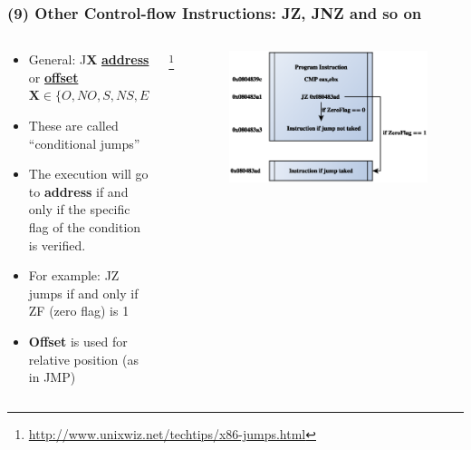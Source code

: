 \documentclass[]{beamer}
\begin{document}
\begin{frame}
  \frametitle{(9) Other Control-flow Instructions: JZ, JNZ and so on}
  \begin{columns}
    \begin{column}{2.5in}
      \begin{itemize}
      \item{General: J\textbf{X} \underline{\textbf{address}} or \underline{\textbf{offset}}}\\
        $ \mathbf{X} \in \{O,NO,S,NS,E,Z,NE...\}$\\
      \item{These are called ``conditional jumps''}
      \item {The execution will go to \textbf{address} if and only if
          the specific flag of the condition is verified.}
      \item {For example: JZ jumps if and only if ZF (zero flag) is 1}
      \item{\textbf{Offset} is used for relative position (as in JMP)}
      \end{itemize}
    \end{column}\footnote{\url{http://www.unixwiz.net/techtips/x86-jumps.html}}
    \begin{column}{2.5in}
      \begin{figure}
        \includegraphics[width=\textwidth]{images/j_unc.eps}									      \label{control}
        \label{Control Flow JZ}
      \end{figure}
    \end{column}

  \end{columns}
\end{frame}
\end{document}
